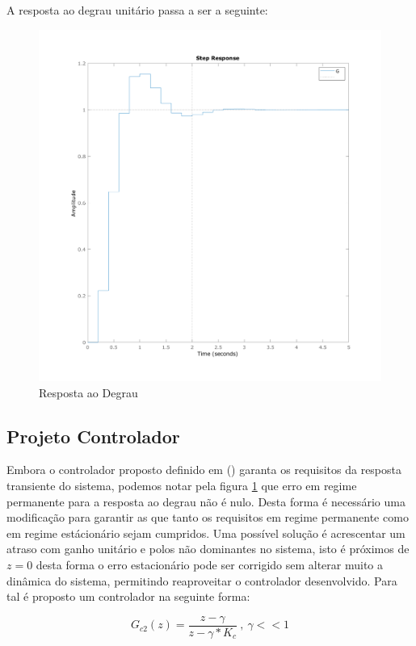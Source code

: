 \documentclass[a4paper,11pt]{article}
\begin{document}
A resposta ao degrau unitário passa a ser a seguinte:

\begin{figure}[H]
    \centering
    \includegraphics[width=0.9\linewidth]{img/exsim3-step-g2-control.png}
    \caption{Resposta ao Degrau}
    \label{fig:ex3-step-g2-control}
\end{figure}



\subsection{Projeto Controlador}

Embora o controlador proposto definido em () garanta os requisitos da resposta transiente do sistema, podemos notar pela figura \ref{fig:ex3-step-g2-control} que erro em regime permanente para a resposta ao degrau não é nulo. Desta forma é necessário uma modificação para garantir as que tanto os requisitos em regime permanente como em regime estácionário sejam cumpridos. Uma possível solução é acrescentar um atraso com ganho unitário e polos não dominantes no sistema, isto é próximos de $z=0$ desta forma o erro estacionário pode ser corrigido sem alterar muito a dinâmica do sistema, permitindo reaproveitar o controlador desenvolvido. Para tal é proposto um controlador na seguinte forma:

\begin{equation}
    G_{c2}(z) = \frac{z - \gamma}{z-\gamma*K_c}\ ,\ \gamma << 1
\end{equation}
\end{document}
